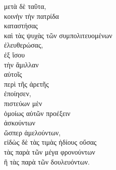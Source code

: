 {\large
\begin{greek}
\noindent μετὰ δὲ ταῦτα, \\
κοινὴν τὴν πατρίδα \\
\tabto{2em} καταστήσας \\
καὶ τὰς ψυχὰς τῶν συμπολιτευομένων \\
\tabto{2em} ἐλευθερώσας,\\ 
ἐξ ἴσου \\
τὴν ἅμιλλαν \\
αὐτοῖς \\
περὶ τῆς ἀρετῆς \\
ἐποίησεν,\\
\tabto{2em} πιστεύων μὲν \\
\tabto{4em} ὁμοίως αὐτῶν προέξειν \\
\tabto{6em} ἀσκούντων \\
\tabto{6em} ὥσπερ ἀμελούντων,\\
\tabto{2em} εἰδὼς δὲ τὰς τιμὰς ἡδίους οὔσας \\
\tabto{4em} τὰς παρὰ τῶν μέγα φρονούντων \\
\tabto{4em} ἢ τὰς παρὰ τῶν δουλευόντων.\\

\end{greek}
}

